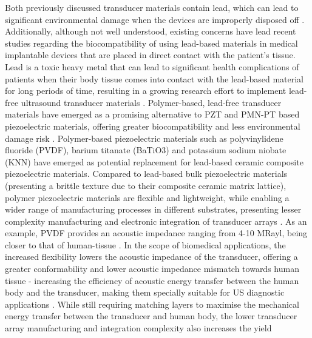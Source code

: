 Both previously discussed transducer materials contain lead, which can lead to significant 
environmental damage when the devices are improperly disposed off \cite{https://iopscience.iop.org/article/10.1088/1361-6463/ac8687, 
https://doi.org/10.1533/9781845699758.1.318, https://doi.org/10.1016/j.ceramint.2021.03.054}. 
Additionally, although not well understood, existing concerns have lead recent studies regarding the biocompatibility of using lead-based materials 
in medical implantable devices that are placed in direct contact with the patient's tissue. Lead is a toxic heavy metal that can lead to significant health complications of patients when their body tissue comes into contact with the lead-based material for long periods of time, 
resulting in a growing research effort to implement lead-free ultrasound transducer materials \cite{https://doi.org/10.1016/j.ceramint.2021.03.054, https://iopscience.iop.org/article/10.1088/1361-6463/ac8687}. Polymer-based, lead-free transducer materials have emerged as a promising alternative to PZT and PMN-PT 
based piezoelectric materials, offering greater biocompatibility and less environmental damage risk 
\cite{https://iopscience.iop.org/article/10.1088/1361-6463/ac8687}. 
Polymer-based piezoelectric materials such as polyvinylidene fluoride (PVDF), 
barium titanate (BaTiO3) and potassium sodium niobate (KNN) have emerged as potential replacement 
for lead-based ceramic composite piezoelectric materials.
Compared to lead-based bulk piezoelectric materials 
(presenting a brittle texture due to their composite ceramic matrix lattice), 
polymer piezoelectric materials are flexible and lightweight, while enabling a 
wider range of manufacturing processes in different substrates, presenting lesser 
complexity manufacturing and electronic integration of transducer arrays 
\cite{https://doi.org/10.1016/j.ceramint.2021.03.054}. As an example, PVDF provides an acoustic impedance 
ranging from 4-10 MRayl, being closer to that of human-tissue \cite{https://ieeexplore.ieee.org/abstract/document/9354791}. 
In the scope of biomedical applications, 
the increased flexibility lowers the acoustic impedance of the transducer, offering a greater 
conformability and lower acoustic impedance mismatch towards human tissue - increasing the efficiency 
of acoustic energy transfer between the human body and the transducer, making them specially suitable for 
US diagnostic applications \cite{https://doi.org/10.1016/j.ceramint.2021.03.054}. 
While still requiring matching layers to maximise the mechanical energy transfer between the 
transducer and human body, the lower transducer array manufacturing and integration complexity also increases the yield 

